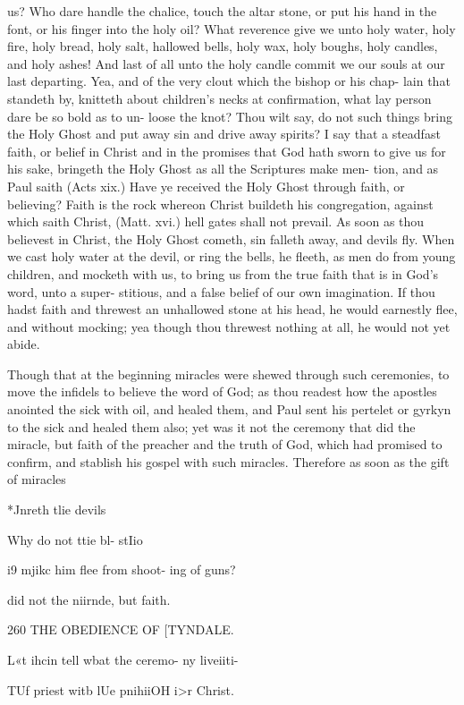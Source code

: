 \documentclass{custom}
\begin{document}
{{us? Who dare handle the chalice, touch the altar stone, 
or put his hand in the font, or his finger into the holy 
oil? What reverence give we unto holy water, holy fire, 
holy bread, holy salt, hallowed bells, holy wax, holy 
boughs, holy candles, and holy ashes! And last of all unto 
the holy candle commit we our souls at our last departing. 
Yea, and of the very clout which the bishop or his chap- 
lain that standeth by, knitteth about children's necks at 
confirmation, what lay person dare be so bold as to un- 
loose the knot? Thou wilt say, do not such things bring 
the Holy Ghost and put away sin and drive away spirits? 
I say that a steadfast faith, or belief in Christ and in the 
promises that God hath sworn to give us for his sake, 
bringeth the Holy Ghost as all the Scriptures make men- 
tion, and as Paul saith (Acts xix.) Have ye received the 
Holy Ghost through faith, or believing? Faith is the 
rock whereon Christ buildeth his congregation, against 
which saith Christ, (Matt. xvi.) hell gates shall not prevail. 
As soon as thou believest in Christ, the Holy Ghost 
cometh, sin falleth away, and devils fly. When we cast 
holy water at the devil, or ring the bells, he fleeth, as men 
do from young children, and mocketh with us, to bring 
us from the true faith that is in God's word, unto a super- 
stitious, and a false belief of our own imagination. If 
thou hadst faith and threwest an unhallowed stone at 
his head, he would earnestly flee, and without mocking; 
yea though thou threwest nothing at all, he would not yet 
abide. 

Though that at the beginning miracles were shewed 
through such ceremonies, to move the infidels to believe 
the word of God; as thou readest how the apostles 
anointed the sick with oil, and healed them, and Paul sent 
his pertelet or gyrkyn to the sick and healed them also; 
yet was it not the ceremony that did the miracle, but 
faith of the preacher and the truth of God, which had 
promised to confirm, and stablish his gospel with such 
miracles. Therefore as soon as the gift of miracles 

*Jnreth tlie 
devils 

Why do 
not ttie bl- 
stIio}i9 mjikc 
him flee 
from shoot- 
ing of guns? 

did not the 
niirnde, 
but faith. 


260
THE OBEDIENCE OF
[TYNDALE.

L«t ihcin 
tell wbat 
the ceremo- 
ny liveiiti- 

TUf priest 
witb lUe 
pnihiiOH i>r 
Christ. 

}
\end{document}
